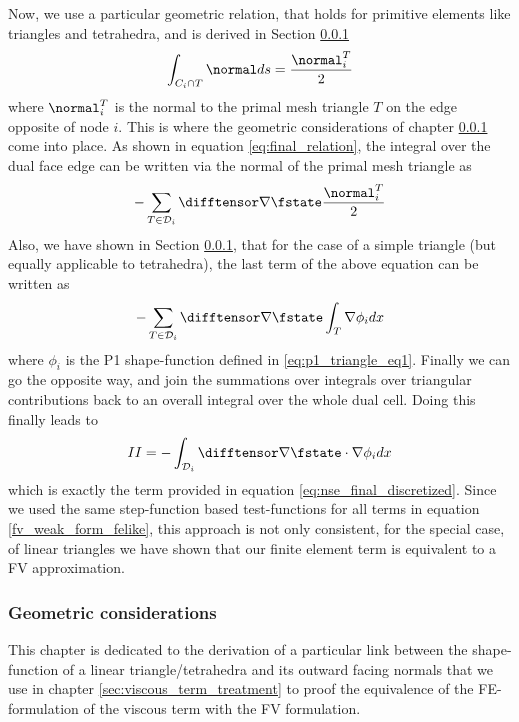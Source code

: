 \documentclass[../main.tex]{subfiles}
\begin{document}
Now, we use a particular geometric relation, that holds for primitive elements like triangles and tetrahedra, and is  derived in Section \ref{sec:geometric_considerations}
\begin{align}
  \int_{C_i\cap T} \normal ds = \frac{\normal_i^T}{2}
\end{align}
where $\normal_i^T$ is the normal to the primal mesh triangle $T$ on the edge opposite of node $i$.
This is where the geometric considerations of chapter \ref{sec:geometric_considerations} come into place. As shown in equation \eqref{eq:final_relation}, the integral over the dual face edge can be written via the normal of the primal mesh triangle as
\begin{align}
  -\sum_{T\in\mathcal{D}_i} \difftensor \nabla\fstate \frac{\normal_i^T}{2}
\end{align}
Also, we have shown in Section \ref{sec:geometric_considerations}, that for the case of a simple triangle (but equally applicable to tetrahedra), the last term of the above equation can be written as
\begin{align}
  -\sum_{T\in\mathcal{D}_i} \difftensor \nabla\fstate \int_T \nabla \phi_i dx
\end{align}
where $\phi_i$ is the P1 shape-function defined in \eqref{eq:p1_triangle_eq1}.
Finally we can go the opposite way, and join the summations over integrals over triangular contributions back to an overall integral over the whole dual cell. Doing this finally leads to
\begin{align}
  II = -\int_{\mathcal{D}_i} \difftensor \nabla\fstate\cdot\nabla \phi_i dx
\end{align}
which is exactly the term provided in equation \eqref{eq:nse_final_discretized}.
Since we used the same step-function based test-functions for all terms in equation \eqref{fv_weak_form_felike}, this approach is not only consistent, for the special case, of linear triangles we have shown that our finite element term is equivalent to a FV approximation.



\subsubsection{Geometric considerations}\label{sec:geometric_considerations}
This chapter is dedicated to the derivation of a particular link between the shape-function of a linear triangle/tetrahedra and its outward facing normals that we use in chapter \ref{sec:viscous_term_treatment} to proof the equivalence of the \ac{FE}-formulation of the viscous term with the \ac{FV} formulation.
\end{document}
